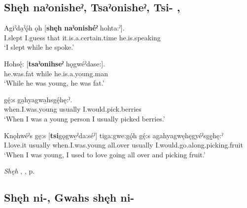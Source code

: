 \subsection*{\textbf{Shęh naˀonisheˀ, Tsaˀonisheˀ, Tsi-} , } \label{p:[shęh naˀonisheˀ]}

\ea
\label{ex:spart32}
\gll Agiˀda̱ˀǫ́h ǫh [\textbf{shęh} \textbf{naˀonishéˀ} hohta:ˀ].\\
I.slept I.guess that it.is.a.certain.time he.is.speaking\\
\glt ‘I slept while he spoke.’
\z

\ea
\label{ex:spart33}
\gll Hohsę́: [\textbf{tsaˀonihseˀ} hǫgwéˀdase:].\\
he.was.fat while he.is.a.young.man\\
\glt ‘While he was young, he was fat.’
\z

\ea
\label{ex:spart34}
 gę́:s ga̱hyagwa̱hsgę́hę:ˀ.\\
when.I.was.young usually I.would.pick.berries\\
\glt ‘When I was a young person I usually picked berries.’
\z

\ea
\label{ex:spart35}
\gll Knǫhwéˀs gę:s [\textbf{tsi}gǫgwe̱ˀda:séˀ] tiga:gwe:gǫ́h gę́:s agahyagwęhęgyéˀsgę̱hę:ˀ\\
I.love.it usually when.I.was.young all.over usually I.would.go.along.picking.fruit\\
\glt ‘When I was young, I used to love going all over and picking fruit.’
\z

\begin{CayugaRelated}
\item \textit{Shęh} , , p. \pageref{p:[shęh] `because’}
\end{CayugaRelated}

\subsection*{\textbf{Shęh ni-, Gwahs shęh ni-} } \label{p:[shęh ni-], [gwahs shęh ni-]}

